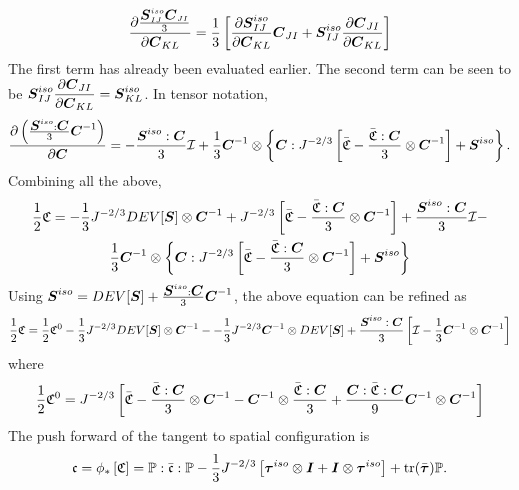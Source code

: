 \documentclass[11pt,twoside,TimesRoman]{article}
\newcommand{\parder}[2]{{\dfrac{\partial #1}{\partial #2}}}
\begin{document}
\begin{gather}
 	\parder{\frac{\bfS^{iso}_{IJ}\bfC_{JI}}{3}}{\bfC_{KL}} = \frac{1}{3} \left[  \parder{\bfS^{iso}_{IJ}}{\bfC_{KL}} \bfC_{JI} +  \bfS^{iso}_{IJ}  \parder{\bfC_{JI}}{\bfC_{KL}}   \right] 
\end{gather}
The first term has already been evaluated earlier. The second term can be seen to be $\bfS^{iso}_{IJ}  \parder{\bfC_{JI}}{\bfC_{KL}} = \bfS^{iso}_{KL}$. In tensor notation,
\begin{equation}
\parder{\left( \frac{\bfS^{iso}:\bfC}{3}\bfC^{-1} \right)}{\bfC} = -\frac{\bfS^{iso}:\bfC}{3} \mathcal{I}  + \frac{1}{3} \bfCinv \otimes \left\lbrace   \bfC:J^{-2/3} \left[\bar{\mathfrak{C}} - \frac{\bar{\mathfrak{C}}:\bfC}{3}\otimes\bfCinv  \right]  + \bfS^{iso}       \right\rbrace.
\end{equation}
Combining all the above,
\begin{multline}
\frac{1}{2}\mathfrak{C} = -\frac{1}{3} J^{-2/3} DEV[\mbox{\boldmath $S$}]  \otimes {\mbox{\boldmath $C$}^{-1}} + J^{-2/3}\left[\bar{\mathfrak{C}}- \frac{\bar{\mathfrak{C}}: \mbox{\boldmath $C$}}{3}  \otimes \mbox{\boldmath $C$}^{-1} \right] +\frac{\mbox{\boldmath $S$}^{iso}:\mbox{\boldmath $C$}}{3} \mathcal{I}  - \\
\frac{1}{3} {\mbox{\boldmath $C$}}^{-1} \otimes \left\lbrace   \mbox{\boldmath $C$}:J^{-2/3} \left[\bar{\mathfrak{C}} - \frac{\bar{\mathfrak{C}}:\mbox{\boldmath $C$}}{3}\otimes{\mbox{\boldmath $C$}}^{-1}  \right]  + \mbox{\boldmath $S$}^{iso}       \right\rbrace
\end{multline}
Using $\mbox{\boldmath $S$}^{iso} = DEV[\mbox{\boldmath $S$}] + \frac{\mbox{\boldmath $S$}^{iso}:\mbox{\boldmath $C$}}{3} {\mbox{\boldmath $C$}}^{-1}$, the above equation can be refined as 
\begin{multline}
\frac{1}{2}\mathfrak{C} = \frac{1}{2}\mathfrak{C}^0-\frac{1}{3} J^{-2/3} DEV[\mbox{\boldmath $S$}]  \otimes {\mbox{\boldmath $C$}}^{-1} - -\frac{1}{3}J^{-2/3} {\mbox{\boldmath $C$}}^{-1} \otimes  DEV[\mbox{\boldmath $S$}]  + 
\frac{\mbox{\boldmath $S$}^{iso}:\mbox{\boldmath $C$}}{3}\left[ \mathcal{I} - \frac{1}{3} {\mbox{\boldmath $C$}}^{-1} \otimes {\mbox{\boldmath $C$}}^{-1} \right]
\end{multline}
where
\begin{equation}
\frac{1}{2}\mathfrak{C}^0=   J^{-2/3}\left[\bar{\mathfrak{C}} - \frac{\bar{\mathfrak{C}}: \mbox{\boldmath $C$}}{3}  \otimes \mbox{\boldmath $C$}^{-1} - {\mbox{\boldmath $C$}}^{-1} \otimes \frac{\bar{\mathfrak{C}}: \mbox{\boldmath $C$}}{3} + \frac{\mbox{\boldmath $C$}:\bar{\mathfrak{C}} :\mbox{\boldmath $C$}}{9}  {\mbox{\boldmath $C$}}^{-1} \otimes {\mbox{\boldmath $C$}}^{-1} \right] 
\end{equation}
The push forward of the tangent to spatial configuration is
\begin{equation}
 \mathfrak{c} = \phi_* \left[\mathfrak{C} \right] =  \mathbb{P}:\bar{\mathfrak{c}}:\mathbb{P} - \frac{1}{3} J^{-2/3} \left[{\mbox{\boldmath $\tau$}}^{iso} \otimes \mbox{\boldmath $I$}  +\mbox{\boldmath $I$} \otimes  {\mbox{\boldmath $\tau$}}^{iso} \right] + \text{tr}(\bar{\mbox{\boldmath $\tau$}}) \mathbb{P}.
\end{equation}
\end{document}
